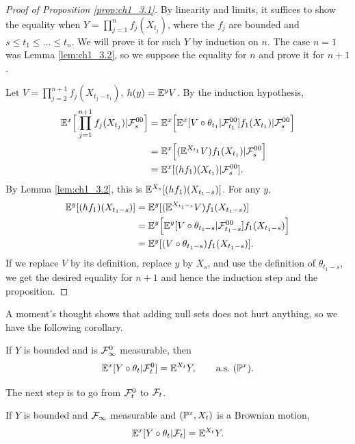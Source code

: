 \begin{proof}[Proof of Proposition \ref{prop:ch1_3.1}]
By linearity and limits, it suffices to show the equality when $Y = \prod_{j=1}^n f_j(X_{t_j})$, where the $f_j$ are bounded and $s \leq t_1 \leq \ldots \leq t_n$. We will prove it for such $Y$ by induction on $n$. The case $n = 1$ was Lemma \ref{lem:ch1_3.2}, so we suppose the equality for $n$ and prove it for $n + 1$.

Let $V = \prod_{j=2}^{n+1} f_j(X_{t_j-t_1})$, $h(y) = \E^y V$. By the induction hypothesis,
\begin{align*}
    \E^x\Big[\prod_{j=1}^{n+1}f_j(X_{t_j})\mid \FC_s^{00}\Big] &= \E^x\Big[\E^x[V \circ \theta_{t_1}\mid \FC_{t_1}^{00}]f_1(X_{t_1})\mid \FC_s^{00}\Big] \\
    &= \E^x\Big[(\E^{X_{t_1}}V)f_1(X_{t_1})\mid \FC_s^{00}\Big] \\
    &= \E^x[(hf_1)(X_{t_1})\mid \FC_s^{00}].
\end{align*}
By Lemma \ref{lem:ch1_3.2}, this is $\E^{X_s}[(hf_1)(X_{t_1-s})]$. For any $y$,
\begin{align*}
    \E^y[(hf_1)(X_{t_1-s})] &= \E^y[(\E^{X_{t_1-s}}V)f_1(X_{t_1-s})] \\
    &= \E^y\Big[\E^y[V \circ \theta_{t_1-s}\mid \FC_{t_1-s}^{00}]f_1(X_{t_1-s})\Big] \\
    &= \E^y[(V \circ \theta_{t_1-s})f_1(X_{t_1-s})].
\end{align*}
If we replace $V$ by its definition, replace $y$ by $X_s$, and use the definition of $\theta_{t_1-s}$, we get the desired equality for $n+1$ and hence the induction step and the proposition.
\end{proof}

A moment's thought shows that adding null sets does not hurt anything, so we have the following corollary.

\begin{corollary}\label{cor:ch1_3.3}
If $Y$ is bounded and is $\FC_\infty^0$ measurable, then
\[
    \E^x[Y \circ \theta_t\mid \FC_t^0] = \E^{X_t}Y, \qquad \textnormal{a.s.}~ (\P^x).
\]
\end{corollary}

The next step is to go from $\FC_t^0$ to $\FC_t$.

\begin{theorem}\label{thm:ch1_3.4}
If $Y$ is bounded and $\FC_\infty$ measurable and $(\P^x, X_t)$ is a Brownian motion,
\[
    \E^x[Y \circ \theta_t\mid \FC_t] = \E^{X_t}Y.
\]
\end{theorem}

